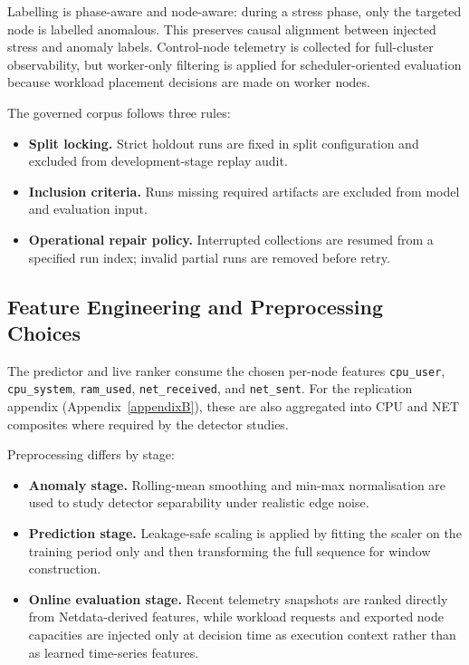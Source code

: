 Labelling is phase-aware and node-aware: during a stress phase, only the targeted node is labelled anomalous. This preserves causal alignment between injected stress and anomaly labels. Control-node telemetry is collected for full-cluster observability, but worker-only filtering is applied for scheduler-oriented evaluation because workload placement decisions are made on worker nodes.

The governed corpus follows three rules:

\begin{itemize}
\item \textbf{Split locking.} Strict holdout runs are fixed in split configuration and excluded from development-stage replay audit.
\item \textbf{Inclusion criteria.} Runs missing required artifacts are excluded from model and evaluation input.
\item \textbf{Operational repair policy.} Interrupted collections are resumed from a specified run index; invalid partial runs are removed before retry.
\end{itemize}

\subsection{Feature Engineering and Preprocessing Choices}

The predictor and live ranker consume the chosen per-node features \texttt{cpu\_user}, \texttt{cpu\_system}, \texttt{ram\_used}, \texttt{net\_received}, and \texttt{net\_sent}. For the replication appendix (Appendix~\ref{appendixB}), these are also aggregated into CPU and NET composites where required by the detector studies.

Preprocessing differs by stage:

\begin{itemize}
\item \textbf{Anomaly stage.} Rolling-mean smoothing and min-max normalisation are used to study detector separability under realistic edge noise.
\item \textbf{Prediction stage.} Leakage-safe scaling is applied by fitting the scaler on the training period only and then transforming the full sequence for window construction.
\item \textbf{Online evaluation stage.} Recent telemetry snapshots are ranked directly from Netdata-derived features, while workload requests and exported node capacities are injected only at decision time as execution context rather than as learned time-series features.
\end{itemize}

